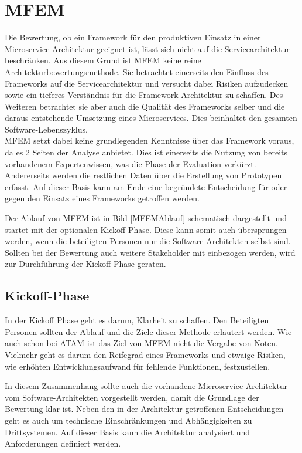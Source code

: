 \section{\acf*{MFEM}}

Die Bewertung, ob ein Framework für den produktiven Einsatz in einer Microservice Architektur geeignet ist, lässt sich nicht auf die Servicearchitektur beschränken. Aus diesem Grund ist \ac{MFEM} keine reine Architektur\-bewertungs\-methode. Sie betrachtet einerseits den Einfluss des Frameworks auf die Servicearchitektur und versucht dabei Risiken aufzudecken sowie ein tieferes Verständnis für die Framework-Architektur zu schaffen. Des Weiteren betrachtet sie aber auch die Qualität des Frameworks selber und die daraus entstehende Umsetzung eines Microservices. Dies beinhaltet den gesamten Software-Lebenszyklus.\\
\ac{MFEM} setzt dabei keine grundlegenden Kenntnisse über das Framework voraus, da es 2 Seiten der Analyse anbietet. Dies ist einerseits die Nutzung von bereits vorhandenem Expertenwissen, was die Phase der Evaluation verkürzt. Andererseits werden die restlichen Daten über die Erstellung von Prototypen erfasst.
Auf dieser Basis kann am Ende eine begründete Entscheidung für oder gegen den Einsatz eines Frameworks getroffen werden.

Der Ablauf von \ac{MFEM} ist in Bild \ref{MFEMAblauf} schematisch dargestellt und startet mit der optionalen Kickoff-Phase. Diese kann somit auch übersprungen werden, wenn die beteiligten Personen nur die Software-Architekten selbst sind. Sollten bei der Bewertung auch weitere Stakeholder mit einbezogen werden, wird zur Durchführung der Kickoff-Phase geraten.


\subsection{Kickoff-Phase}

In der Kickoff Phase geht es darum, Klarheit zu schaffen. Den Beteiligten Personen sollten der Ablauf und die Ziele dieser Methode erläutert werden. Wie auch schon bei \ac{ATAM} ist das Ziel von \ac{MFEM} nicht die Vergabe von Noten. Vielmehr geht es darum den Reifegrad eines Frameworks und etwaige Risiken, wie erhöhten Entwicklungsaufwand für fehlende Funktionen, festzustellen. 

In diesem Zusammenhang sollte auch die vorhandene Microservice Architektur vom Software-Architekten vorgestellt werden, damit die Grundlage der Bewertung klar ist. Neben den in der Architektur getroffenen Entscheidungen geht es auch um technische Einschränkungen und Abhängigkeiten zu Drittsystemen. Auf dieser Basis kann die Architektur analysiert und Anforderungen definiert werden.

